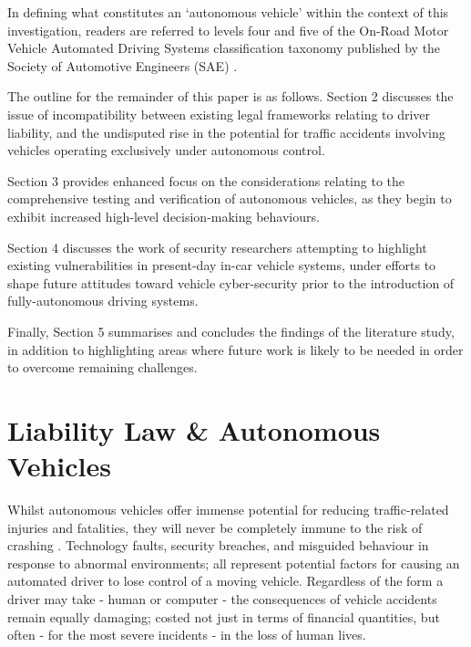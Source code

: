 \documentclass[conference]{IEEEtran}
\begin{document}
 In defining what constitutes an `autonomous vehicle' within the context of this investigation, readers are referred to levels four and five of the On-Road Motor Vehicle Automated Driving Systems classification taxonomy published by the Society of Automotive Engineers (SAE) \cite{sae}.
 
 The outline for the remainder of this paper is as follows. Section 2 discusses the issue of incompatibility between existing legal frameworks relating to driver liability, and the undisputed rise in the potential for traffic accidents involving vehicles operating exclusively under autonomous control. 
 
Section 3 provides enhanced focus on the considerations relating to the comprehensive testing and verification of autonomous vehicles, as they begin to exhibit increased high-level decision-making behaviours.

Section 4 discusses the work of security researchers attempting to highlight existing vulnerabilities in present-day in-car vehicle systems, under efforts to shape future attitudes toward vehicle cyber-security prior to the introduction of fully-autonomous driving systems.

Finally, Section 5 summarises and concludes the findings of the literature study, in addition to highlighting areas where future work is likely to be needed in order to overcome remaining challenges.

\section{Liability Law \& Autonomous Vehicles}

Whilst autonomous vehicles offer immense potential for reducing traffic-related injuries and fatalities, they will never be completely immune to the risk of crashing \cite{marchant}. Technology faults, security breaches, and misguided behaviour in response to abnormal environments; all represent potential factors for causing an automated driver to lose control of a moving vehicle. Regardless of the form a driver may take - human or computer - the consequences of vehicle accidents remain equally damaging; costed not just in terms of financial quantities, but often - for the most severe incidents - in the loss of human lives. 
\end{document}
